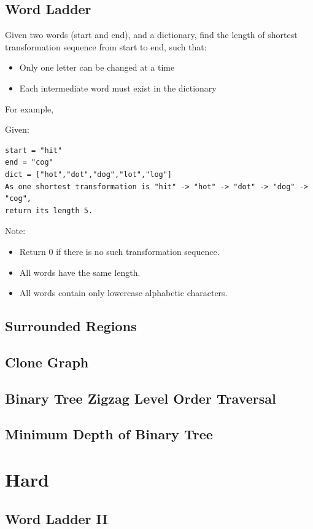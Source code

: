 \documentclass[12pt]{book}
\begin{document}
\subsection{Word Ladder}
\label{sec-7-2-1}
Given two words (start and end), and a dictionary, find the length of shortest transformation sequence from start to end, such that:
\begin{itemize}
\item Only one letter can be changed at a time
\item Each intermediate word must exist in the dictionary
\end{itemize}
For example,

Given:
\lstset{language=java,label= ,caption= ,numbers=none}
\begin{lstlisting}
start = "hit"
end = "cog"
dict = ["hot","dot","dog","lot","log"]
As one shortest transformation is "hit" -> "hot" -> "dot" -> "dog" -> "cog",
return its length 5.
\end{lstlisting}
Note:
\begin{itemize}
\item Return 0 if there is no such transformation sequence.
\item All words have the same length.
\item All words contain only lowercase alphabetic characters.
\end{itemize}
\subsection{Surrounded Regions}
\label{sec-7-2-2}
\subsection{Clone Graph}
\label{sec-7-2-3}
\subsection{Binary Tree Zigzag Level Order Traversal}
\label{sec-7-2-4}
\subsection{Minimum Depth of Binary Tree}
\label{sec-7-2-5}

\section{Hard}
\label{sec-7-3}
\subsection{Word Ladder II}
\label{sec-7-3-1}
\end{document}
